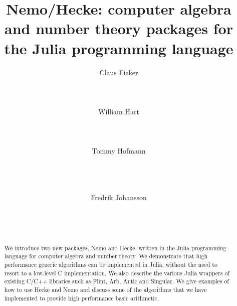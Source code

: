 \documentclass{sig-alternate-05-2015}
\begin{document}

\newtheorem{alg}{Algorithm}
\newtheorem{definition}{Definition}
\newtheorem{Assertion}{Assertion}

\providecommand{\QQ}{\mathbb{Q}}

\makeatletter
\def\Ddots{\mathinner{\mkern1mu\raise\p@
\vbox{\kern7\p@\hbox{.}}\mkern2mu
\raise4\p@\hbox{.}\mkern2mu\raise7\p@\hbox{.}\mkern1mu}}
\makeatother

\title{Nemo/Hecke: computer algebra and number theory packages for the Julia programming language}

\author{
\alignauthor Claus Fieker\\
   \\
   \\
   \\
\alignauthor William Hart\\
   \\
   \\
   \\
\alignauthor Tommy Hofmann\\
   \\
   \\
   \\
\and
\alignauthor Fredrik Johansson\\
   \\
    \\
   \\
}

\maketitle

\begin{abstract}
We introduce two new packages, Nemo and Hecke, written in the Julia programming language
for computer algebra and number theory.
We demonstrate that high performance generic
algorithms can be implemented in Julia, without the need to resort to a low-level C
implementation. We also describe the various Julia wrappers of existing C/C++ libraries
such as Flint, Arb, Antic and Singular. We give examples of how to use Hecke and Nemo and discuss
some of the algorithms that we have implemented to provide high performance basic
arithmetic.
\end{abstract}
\end{document}
